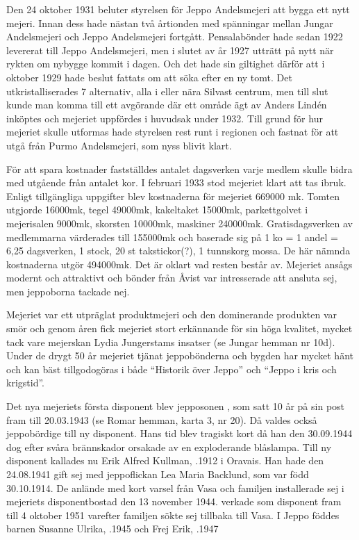 
Den 24 oktober 1931 beluter styrelsen för Jeppo Andelsmejeri att bygga ett nytt mejeri. Innan dess hade nästan två årtionden med spänningar mellan Jungar Andelsmejeri och Jeppo Andelsmejeri fortgått. Pensalabönder hade sedan 1922 levererat till Jeppo Andelsmejeri, men i slutet av år 1927 utträtt på nytt när rykten om nybygge kommit i dagen. Och det hade sin giltighet därför att i oktober 1929 hade beslut fattats om att söka efter en ny tomt. Det utkristalliserades 7 alternativ, alla i eller nära Silvast centrum, men till slut kunde man komma till ett avgörande där ett område ägt av Anders Lindén inköptes och mejeriet uppfördes i huvudsak under 1932. Till grund för hur mejeriet skulle utformas hade styrelsen rest runt i regionen och fastnat för att utgå från Purmo Andelsmejeri, som nyss blivit klart.

För att spara kostnader fastställdes antalet dagsverken varje medlem skulle bidra med utgående från antalet kor. I februari 1933 stod mejeriet klart att tas ibruk. Enligt tillgängliga uppgifter blev kostnaderna för mejeriet 669000 mk. Tomten utgjorde 16000mk, tegel 49000mk, kakeltaket 15000mk, parkettgolvet i mejerisalen 9000mk, skorsten 10000mk, maskiner 240000mk. Gratisdagsverken av medlemmarna värderades till 155000mk och baserade sig på 1 ko = 1 andel = 6,25 dagsverken, 1 stock, 20 st takstickor(?), 1 tunnskorg mossa. De här nämnda kostnaderna utgör 494000mk. Det är oklart vad resten består av. Mejeriet ansågs modernt och attraktivt och bönder från Åvist var intresserade att ansluta sej, men jeppoborna tackade nej.


Mejeriet var ett utpräglat produktmejeri och den dominerande produkten var smör och genom åren fick mejeriet stort erkännande för sin höga kvalitet, mycket tack vare mejerskan Lydia Jungerstams insatser (se Jungar hemman nr 10d). Under de drygt 50 år mejeriet tjänat jeppobönderna och bygden har mycket hänt och kan bäst tillgodogöras i både ``Historik över Jeppo'' och ``Jeppo i kris och krigstid''.

Det nya mejeriets första disponent blev jepposonen , som satt 10 år på sin post fram till 20.03.1943 (se Romar hemman, karta 3, nr 20). Då valdes också jeppobördige  till ny disponent. Hans tid blev tragiskt kort då han den 30.09.1944 dog efter svåra brännskador orsakade av en exploderande blåslampa. Till ny disponent kallades nu Erik Alfred Kullman, .1912 i Oravais. Han hade  den 24.08.1941 gift sej med jeppoflickan Lea Maria Backlund, som var född 30.10.1914. De anlände med kort varsel från Vasa och familjen installerade sej i mejeriets disponentbostad den 13 november 1944.  verkade som disponent fram till 4 oktober 1951 varefter familjen sökte sej tillbaka till Vasa.
I Jeppo föddes barnen Susanne Ulrika, .1945 och Frej Erik, .1947

